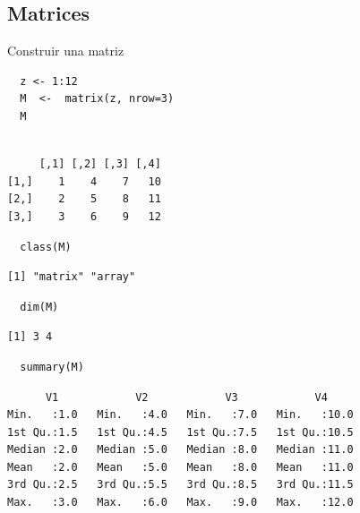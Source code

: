 \documentclass[aspectratio=169, usenames,svgnames,dvipsnames]{beamer}
\begin{document}
\subsection{Matrices}
\label{sec:org0bf61d3}
\begin{frame}[label={sec:org22e9e53},fragile]{Construir una matriz}
 \lstset{language=r,label= ,caption= ,captionpos=b,numbers=none}
\begin{lstlisting}
  z <- 1:12
  M  <-  matrix(z, nrow=3)
  M
\end{lstlisting}

\begin{verbatim}

     [,1] [,2] [,3] [,4]
[1,]    1    4    7   10
[2,]    2    5    8   11
[3,]    3    6    9   12
\end{verbatim}


\lstset{language=r,label= ,caption= ,captionpos=b,numbers=none}
\begin{lstlisting}
  class(M)
\end{lstlisting}

\begin{verbatim}
[1] "matrix" "array"
\end{verbatim}


\lstset{language=r,label= ,caption= ,captionpos=b,numbers=none}
\begin{lstlisting}
  dim(M)
\end{lstlisting}

\begin{verbatim}
[1] 3 4
\end{verbatim}


\lstset{language=r,label= ,caption= ,captionpos=b,numbers=none}
\begin{lstlisting}
  summary(M)
\end{lstlisting}

\begin{verbatim}
      V1            V2            V3            V4      
Min.   :1.0   Min.   :4.0   Min.   :7.0   Min.   :10.0  
1st Qu.:1.5   1st Qu.:4.5   1st Qu.:7.5   1st Qu.:10.5  
Median :2.0   Median :5.0   Median :8.0   Median :11.0  
Mean   :2.0   Mean   :5.0   Mean   :8.0   Mean   :11.0  
3rd Qu.:2.5   3rd Qu.:5.5   3rd Qu.:8.5   3rd Qu.:11.5  
Max.   :3.0   Max.   :6.0   Max.   :9.0   Max.   :12.0
\end{verbatim}
\end{frame}
\end{document}
